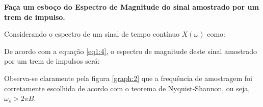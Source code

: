\textbf{Faça um esboço do Espectro de Magnitude do sinal amostrado por um trem de impulso.}

Considerando o espectro de um sinal de tempo contínuo $X(\omega)$ como:



De acordo com a equação \ref{eq1:4}, o espectro de magnitude deste sinal amostrado por um trem de impulsos será:



Observa-se claramente pela figura \ref{graph:2} que a frequência de amostragem foi corretamente escolhida de acordo com o teorema de Nyquist-Shannon, ou seja, $\omega_s>2\pi B$. 
